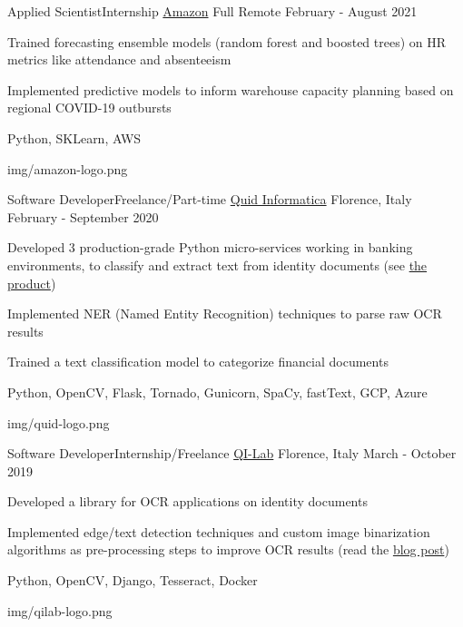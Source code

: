 \begin{cventries}
  \logocventry
    {Applied Scientist{\enskip\cdotp\enskip}Internship}
    {\href{https://www.amazon.com/}{Amazon}}
    {Full Remote}
    {February - August 2021}
    {
      \begin{cvitems}
        \item {Trained forecasting ensemble models (random forest and boosted trees) on HR metrics like attendance and absenteeism}
        \item {Implemented predictive models to inform warehouse capacity planning based on regional COVID-19 outbursts}
      \end{cvitems}
      \cvexptech
        {Python, SKLearn, AWS}
    }
    {img/amazon-logo.png}

  \logocventry
    {Software Developer{\enskip\cdotp\enskip}Freelance/Part-time}
    {\href{https://www.quidinfo.it/}{Quid Informatica}}
    {Florence, Italy}
    {February - September 2020}
    {
      \begin{cvitems}
        \item {Developed 3 production-grade Python micro-services working in banking environments, to classify and extract text from identity documents (see \textcolor{blue}{\href{https://www.youtube.com/watch?v=eyg-UOAdKA8}{the product}})}
        \item {Implemented NER (Named Entity Recognition) techniques to parse raw OCR results}
        \item {Trained a text classification model to categorize financial documents}
      \end{cvitems}
      \cvexptech
        {Python, OpenCV, Flask, Tornado, Gunicorn, SpaCy, fastText, GCP, Azure}
    }
    {img/quid-logo.png}
  
  \logocventry
    {Software Developer{\enskip\cdotp\enskip}Internship/Freelance}
    {\href{https://www.qi-lab.it/}{QI-Lab}}
    {Florence, Italy}
    {March - October 2019}
    {
      \begin{cvitems}
        \item {Developed a library for OCR applications on identity documents}
        \item {Implemented edge/text detection techniques and custom image binarization algorithms as pre-processing steps to improve OCR results (read the \textcolor{blue}{\href{https://web.archive.org/web/20210616083923/https://www.qi-lab.it/2019/08/29/tecniche-thresholding-la-binarizzazione-immagini/}{blog post}})}
      \end{cvitems}
      \cvexptech
        {Python, OpenCV, Django, Tesseract, Docker}
    }
    {img/qilab-logo.png}


\end{cventries}

